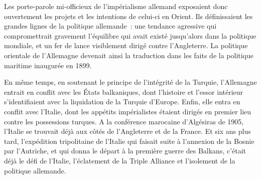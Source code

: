 \documentclass[french,twoside]{book} %
\begin{document}
\noindent Les porte-parole mi-officieux de l’impérialisme allemand exposaient donc ouvertement les projets et les intentions de celui-ci en Orient. Ils définissaient les grandes lignes de la politique allemande : une tendance agressive qui compromettrait gravement l’équilibre qui avait existé jusqu’alors dans la politique mondiale, et un fer de lance visiblement dirigé contre l’Angleterre. La politique orientale de l’Allemagne devenait ainsi la traduction dans les faits de la politique maritime inaugurée en 1899.\par
En même temps, en soutenant le principe de l’intégrité de la Turquie, l’Allemagne entrait en conflit avec les États balkaniques, dont l’histoire et l’essor intérieur s’identifiaient avec la liquidation de la Turquie d’Europe. Enfin, elle entra en conflit avec l’Italie, dont les appétits impérialistes étaient dirigés en premier lieu contre les possessions turques. A la conférence marocaine d’Algésiras de 1905, l’Italie se trouvait déjà aux côtés de l’Angleterre et de la France. Et six ans plus tard, l’expédition tripolitaine de l’Italie qui faisait suite à l’annexion de la Bosnie par l’Autriche, et qui donna le départ à la première guerre des Balkans, c’était déjà le défi de l’Italie, l’éclatement de la Triple Alliance et l’isolement de la politique allemande.\par
\end{document}
